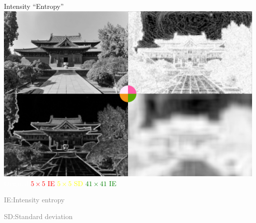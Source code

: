 \documentclass[14pt,c]{beamer}
\begin{document}
\begin{frame}{Intensity ``Entropy''}
  \centering
  \includegraphics[width=0.75\framewidth]{intensity_entropy}
  \\
  \textcolor{white}{Original}\;
  \textcolor{red}{$5\times5$ IE}\;
  \textcolor{yellow}{$5\times5$ SD}\;
  \textcolor{green}{$41\times41$ IE}

  \small
  \textcolor{gray}{IE:\@ Intensity entropy}

  \textcolor{gray}{SD:\@ Standard deviation}
\end{frame}
\end{document}
